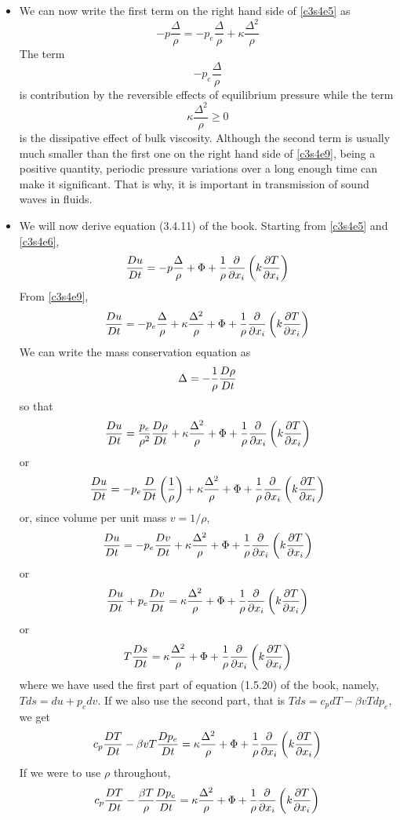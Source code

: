\begin{itemize}
\item We can now write the first term on the right hand side of \eqref{c3s4e5} as
\begin{equation}\label{c3s4e9}
-p\frac{\Delta}{\rho} = -p_e\frac{\Delta}{\rho} + \kappa\frac{\Delta^2}{\rho}
\end{equation}
The term
\[
-p_e\frac{\Delta}{\rho}
\]
is contribution by the reversible effects of equilibrium pressure while the term
\[
\kappa\frac{\Delta^2}{\rho} \ge 0
\]
is the dissipative effect of bulk viscosity. Although the second term is usually much smaller than the first one on the right hand side of \eqref{c3s4e9}, being a positive quantity,
periodic pressure variations over a long enough time can make it significant. That is why, it is important in transmission of sound waves in fluids.

\item We will now derive equation (3.4.11) of the book. Starting from \eqref{c3s4e5} and \eqref{c3s4e6},
\[
\frac{D{u}}{Dt} = -p\frac{\Delta}{\rho} + \Phi + \frac{1}{\rho}\frac{\partial}{\partial x_i}\left(k\frac{\partial{T}}{\partial{x_i}}\right)
\]
From \eqref{c3s4e9},
\[
\frac{D{u}}{Dt} = -p_e\frac{\Delta}{\rho} + \kappa\frac{\Delta^2}{\rho} + \Phi + \frac{1}{\rho}\frac{\partial}{\partial x_i}\left(k\frac{\partial{T}}{\partial{x_i}}\right)
\]
We can write the mass conservation equation as
\[
\Delta = -\frac{1}{\rho}\frac{D{\rho}}{Dt}
\]
so that
\[
\frac{D{u}}{Dt} = \frac{p_e}{\rho^2}\frac{D{\rho}}{Dt} + \kappa\frac{\Delta^2}{\rho} + \Phi + \frac{1}{\rho}\frac{\partial}{\partial x_i}\left(k\frac{\partial{T}}{\partial{x_i}}\right)
\]
or
\[
\frac{D{u}}{Dt} = -p_e\frac{D}{Dt}\left(\frac{1}{\rho}\right) + \kappa\frac{\Delta^2}{\rho} + \Phi + \frac{1}{\rho}\frac{\partial}{\partial x_i}\left(k\frac{\partial{T}}{\partial{x_i}}\right)
\]
or, since volume per unit mass $v = 1/\rho$,
\[
\frac{D{u}}{Dt} = -p_e\frac{D{v}}{Dt} + \kappa\frac{\Delta^2}{\rho} + \Phi + \frac{1}{\rho}\frac{\partial}{\partial x_i}\left(k\frac{\partial{T}}{\partial{x_i}}\right)
\]
or
\[
\frac{D{u}}{Dt} + p_e\frac{D{v}}{Dt} = \kappa\frac{\Delta^2}{\rho} + \Phi + \frac{1}{\rho}\frac{\partial}{\partial x_i}\left(k\frac{\partial{T}}{\partial{x_i}}\right)
\]
or
\begin{equation}\label{c3s4e9a}
T\frac{D{s}}{Dt} = \kappa\frac{\Delta^2}{\rho} + \Phi + \frac{1}{\rho}\frac{\partial}{\partial x_i}\left(k\frac{\partial{T}}{\partial{x_i}}\right)
\end{equation}
where we have used the first part of equation (1.5.20) of the book, namely, $Tds = du + p_edv$. If we also use the second part, that is $Tds = c_pdT - \beta v T dp_e$, we get
\[
c_p\frac{D{T}}{Dt} - \beta v T \frac{D{p_e}}{Dt} = \kappa\frac{\Delta^2}{\rho} + \Phi + \frac{1}{\rho}\frac{\partial}{\partial x_i}\left(k\frac{\partial{T}}{\partial{x_i}}\right)
\]
If we were to use $\rho$ throughout,
\begin{equation}\label{c3s4e10}
c_p\frac{D{T}}{Dt} - \frac{\beta T}{\rho}\frac{D{p_e}}{Dt} = \kappa\frac{\Delta^2}{\rho} + \Phi + \frac{1}{\rho}\frac{\partial}{\partial x_i}\left(k\frac{\partial{T}}{\partial{x_i}}\right)
\end{equation}
\end{itemize}


